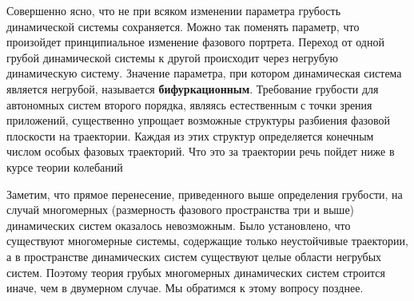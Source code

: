 Совершенно ясно, что не при всяком изменении параметра грубость
динамической системы сохраняется. Можно так поменять параметр, что
произойдет принципиальное изменение фазового портрета. Переход от одной грубой динамической системы к другой происходит через негрубую динамическую систему. Значение параметра, при котором динамическая система является негрубой, называется \textbf{бифуркационным}. Требование грубости для автономных систем второго порядка, являясь естественным с точки зрения приложений, существенно упрощает возможные структуры разбиения фазовой плоскости на траектории. Каждая из этих структур определяется конечным числом особых фазовых траекторий. Что это за траектории речь пойдет ниже в курсе теории колебаний

Заметим, что прямое перенесение, приведенного выше определения
грубости, на случай многомерных (размерность фазового пространства три и выше) динамических систем оказалось невозможным. Было установлено, что существуют многомерные системы, содержащие только неустойчивые траектории, а в пространстве динамических систем существуют целые области
негрубых систем. Поэтому теория грубых многомерных динамических систем строится иначе, чем в двумерном случае. Мы обратимся к этому вопросу позднее.

